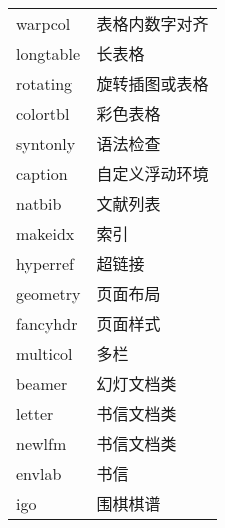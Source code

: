 \begin{longtable}{ll}
    warpcol & 表格内数字对齐 \\
    longtable & 长表格 \\
    rotating & 旋转插图或表格 \\
    colortbl & 彩色表格 \\
  \midrule
    syntonly & 语法检查 \\
    caption & 自定义浮动环境 \\
    natbib & 文献列表 \\
    makeidx & 索引 \\
    hyperref & 超链接 \\
  \midrule
    geometry & 页面布局 \\
    fancyhdr & 页面样式 \\
    multicol & 多栏 \\
  \midrule
    beamer & 幻灯文档类 \\
    letter & 书信文档类 \\
    newlfm & 书信文档类 \\
    envlab & 书信 \\
    igo & 围棋棋谱 \\
\end{longtable}


